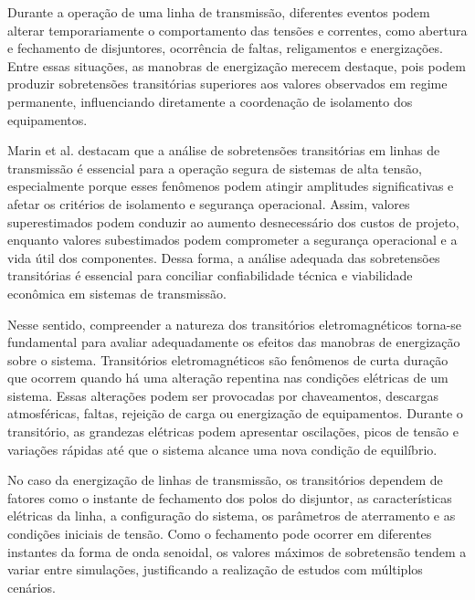 \documentclass[
	12pt,				%
	openright,			%
	oneside,			%
	a4paper,			%
	chapter=TITLE,		%
	section=TITLE,		%
	subsection=TITLE,	%
	subsubsection=TITLE,%
	english,			%
	brazilian			%
	]{abntex2}
\theoremstyle{definition}
\begin{document}
Durante a operação de uma linha de transmissão, diferentes eventos podem alterar temporariamente o comportamento das tensões e correntes, como abertura e fechamento de disjuntores, ocorrência de faltas, religamentos e energizações. Entre essas situações, as manobras de energização merecem destaque, pois podem produzir sobretensões transitórias superiores aos valores observados em regime permanente, influenciando diretamente a coordenação de isolamento dos equipamentos.

Marin et al. \cite{marin2025} destacam que a análise de sobretensões transitórias em linhas de transmissão é essencial para a operação segura de sistemas de alta tensão, especialmente porque esses fenômenos podem atingir amplitudes significativas e afetar os critérios de isolamento e segurança operacional. Assim, valores superestimados podem conduzir ao aumento desnecessário dos custos de projeto, enquanto valores subestimados podem comprometer a segurança operacional e a vida útil dos componentes. Dessa forma, a análise adequada das sobretensões transitórias é essencial para conciliar confiabilidade técnica e viabilidade econômica em sistemas de transmissão.


Nesse sentido, compreender a natureza dos transitórios eletromagnéticos torna-se fundamental para avaliar adequadamente os efeitos das manobras de energização sobre o sistema. Transitórios eletromagnéticos são fenômenos de curta duração que ocorrem quando há uma alteração repentina nas condições elétricas de um sistema. Essas alterações podem ser provocadas por chaveamentos, descargas atmosféricas, faltas, rejeição de carga ou energização de equipamentos. Durante o transitório, as grandezas elétricas podem apresentar oscilações, picos de tensão e variações rápidas até que o sistema alcance uma nova condição de equilíbrio.

No caso da energização de linhas de transmissão, os transitórios dependem de fatores como o instante de fechamento dos polos do disjuntor, as características elétricas da linha, a configuração do sistema, os parâmetros de aterramento e as condições iniciais de tensão. Como o fechamento pode ocorrer em diferentes instantes da forma de onda senoidal, os valores máximos de sobretensão tendem a variar entre simulações, justificando a realização de estudos com múltiplos cenários.
\end{document}
